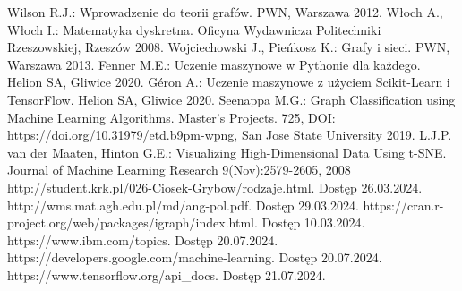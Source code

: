 
\begin{thebibliography}{4}
 Wilson R.J.: Wprowadzenie do teorii grafów. PWN, Warszawa 2012.
 Włoch A., Włoch I.: Matematyka dyskretna. Oficyna Wydawnicza Politechniki Rzeszowskiej, Rzeszów 2008.
 Wojciechowski J., Pieńkosz K.: Grafy i sieci. PWN, Warszawa 2013.
 Fenner M.E.: Uczenie maszynowe w Pythonie dla każdego. Helion SA, Gliwice 2020.
 Géron A.: Uczenie maszynowe z użyciem Scikit-Learn i TensorFlow. Helion SA, Gliwice 2020.
 Seenappa M.G.: Graph Classification using Machine Learning Algorithms. Master's Projects. 725, DOI: https://doi.org/10.31979/etd.b9pm-wpng, San Jose State University 2019.
 L.J.P. van der Maaten, Hinton G.E.: Visualizing High-Dimensional Data Using t-SNE. Journal of Machine Learning Research 9(Nov):2579-2605, 2008
 http://student.krk.pl/026-Ciosek-Grybow/rodzaje.html. Dostęp 26.03.2024.
 http://wms.mat.agh.edu.pl/\texttildelow md/ang-pol.pdf. Dostęp 29.03.2024. 
 https://cran.r-project.org/web/packages/igraph/index.html. Dostęp 10.03.2024.
 https://www.ibm.com/topics. Dostęp 20.07.2024.
 https://developers.google.com/machine-learning. Dostęp 20.07.2024.
 https://www.tensorflow.org/api\_docs. Dostęp 21.07.2024.
\end{thebibliography}